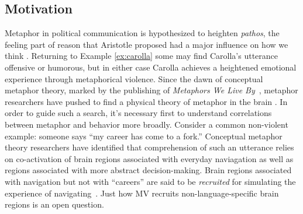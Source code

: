 \subsection{Motivation}

Metaphor in political communication is hypothesized to heighten \emph{pathos},
the feeling part of reason that Aristotle proposed had a major 
influence on how we think \cite{Charteris-Black2009}.  Returning to Example \ref{ex:carolla}
some may find Carolla's utterance offensive or humorous, 
but in either case Carolla achieves a heightened emotional experience 
through metaphorical violence.
Since the dawn of conceptual metaphor theory,
marked by the publishing of \emph{Metaphors We Live By}~\cite{Lakoff1980},
metaphor researchers have pushed to find a physical theory of metaphor in the
brain \cite{Feldman2006}. In order to guide such a search, 
it's necessary first to understand correlations between metaphor and behavior more broadly. 
Consider a common non-violent example: someone says ``my career has come to a fork.'' 
Conceptual metaphor theory researchers have identified that 
comprehension of such an utterance relies on
co-activation of brain regions associated with everyday naviagation as well
as regions associated with more abstract decision-making.
Brain regions associated with 
navigation but not with ``careers'' are said to be \emph{recruited} for
simulating the experience of navigating~\cite{Croft2005,Matlock2004,Gibbs2008}.
Just how MV recruits non-language-specific brain regions is an open question.

